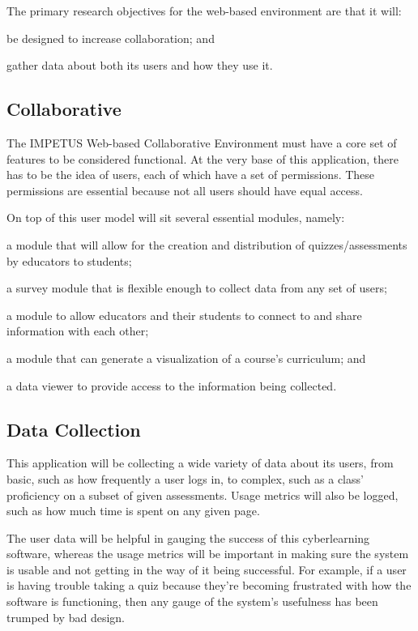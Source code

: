 The primary research objectives for the web-based environment are that it will:
\begin{inparaenum}[\itshape 1\upshape)]
\item be designed to increase collaboration; and
\item gather data about both its users and how they use it.
\end{inparaenum}

\subsection{Collaborative}

The IMPETUS Web-based Collaborative Environment must have a core set of features to be considered functional. At the very base of this application, there has to be the idea of users, each of which have a set of permissions. These permissions are essential because not all users should have equal access.

On top of this user model will sit several essential modules, namely: 
\begin{inparaenum}[\itshape 1\upshape)]
\item a module that will allow for the creation and distribution of quizzes/assessments by educators to students;
\item a survey module that is flexible enough to collect data from any set of users;
\item a module to allow educators and their students to connect to and share information with each other;
\item a module that can generate a visualization of a course's curriculum; and
\item a data viewer to provide access to the information being collected.
\end{inparaenum}

\subsection{Data Collection}

This application will be collecting a wide variety of data about its users, from basic, such as how frequently a user logs in, to complex, such as a class' proficiency on a subset of given assessments. Usage metrics will also be logged, such as how much time is spent on any given page.

The user data will be helpful in gauging the success of this cyberlearning software, whereas the usage metrics will be important in making sure the system is usable and not getting in the way of it being successful. For example, if a user is having trouble taking a quiz because they're becoming frustrated with how the software is functioning, then any gauge of the system's usefulness has been trumped by bad design.


